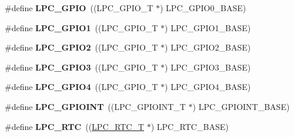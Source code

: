 \begin{DoxyCompactItemize}
\item 
\hypertarget{group___p_e_r_i_p_h__175_x__6_x___b_a_s_e_ga8fce6a072685922bf3ebc1aa9070f408}{\#define {\bfseries L\+P\+C\+\_\+\+G\+P\+I\+O}~((L\+P\+C\+\_\+\+G\+P\+I\+O\+\_\+\+T             $\ast$) L\+P\+C\+\_\+\+G\+P\+I\+O0\+\_\+\+B\+A\+S\+E)}\label{group___p_e_r_i_p_h__175_x__6_x___b_a_s_e_ga8fce6a072685922bf3ebc1aa9070f408}

\item 
\hypertarget{group___p_e_r_i_p_h__175_x__6_x___b_a_s_e_ga335587dad4e6d0da56c1f3ad1c087d10}{\#define {\bfseries L\+P\+C\+\_\+\+G\+P\+I\+O1}~((L\+P\+C\+\_\+\+G\+P\+I\+O\+\_\+\+T             $\ast$) L\+P\+C\+\_\+\+G\+P\+I\+O1\+\_\+\+B\+A\+S\+E)}\label{group___p_e_r_i_p_h__175_x__6_x___b_a_s_e_ga335587dad4e6d0da56c1f3ad1c087d10}

\item 
\hypertarget{group___p_e_r_i_p_h__175_x__6_x___b_a_s_e_ga27a09e8c08f9e209c6af70b0a3c56b39}{\#define {\bfseries L\+P\+C\+\_\+\+G\+P\+I\+O2}~((L\+P\+C\+\_\+\+G\+P\+I\+O\+\_\+\+T             $\ast$) L\+P\+C\+\_\+\+G\+P\+I\+O2\+\_\+\+B\+A\+S\+E)}\label{group___p_e_r_i_p_h__175_x__6_x___b_a_s_e_ga27a09e8c08f9e209c6af70b0a3c56b39}

\item 
\hypertarget{group___p_e_r_i_p_h__175_x__6_x___b_a_s_e_ga6e961eb01d0f1e61dd9b9d5979d2aafc}{\#define {\bfseries L\+P\+C\+\_\+\+G\+P\+I\+O3}~((L\+P\+C\+\_\+\+G\+P\+I\+O\+\_\+\+T             $\ast$) L\+P\+C\+\_\+\+G\+P\+I\+O3\+\_\+\+B\+A\+S\+E)}\label{group___p_e_r_i_p_h__175_x__6_x___b_a_s_e_ga6e961eb01d0f1e61dd9b9d5979d2aafc}

\item 
\hypertarget{group___p_e_r_i_p_h__175_x__6_x___b_a_s_e_ga652a560a972d4edec8a67cd85ad4bd60}{\#define {\bfseries L\+P\+C\+\_\+\+G\+P\+I\+O4}~((L\+P\+C\+\_\+\+G\+P\+I\+O\+\_\+\+T             $\ast$) L\+P\+C\+\_\+\+G\+P\+I\+O4\+\_\+\+B\+A\+S\+E)}\label{group___p_e_r_i_p_h__175_x__6_x___b_a_s_e_ga652a560a972d4edec8a67cd85ad4bd60}

\item 
\hypertarget{group___p_e_r_i_p_h__175_x__6_x___b_a_s_e_gaefe2f52407c1ce58395766dc760525b5}{\#define {\bfseries L\+P\+C\+\_\+\+G\+P\+I\+O\+I\+N\+T}~((L\+P\+C\+\_\+\+G\+P\+I\+O\+I\+N\+T\+\_\+\+T          $\ast$) L\+P\+C\+\_\+\+G\+P\+I\+O\+I\+N\+T\+\_\+\+B\+A\+S\+E)}\label{group___p_e_r_i_p_h__175_x__6_x___b_a_s_e_gaefe2f52407c1ce58395766dc760525b5}

\item 
\hypertarget{group___p_e_r_i_p_h__175_x__6_x___b_a_s_e_ga8303d3e5135b2a039f0dc5f93c194f78}{\#define {\bfseries L\+P\+C\+\_\+\+R\+T\+C}~((\hyperlink{struct_l_p_c___r_t_c___t}{L\+P\+C\+\_\+\+R\+T\+C\+\_\+\+T}              $\ast$) L\+P\+C\+\_\+\+R\+T\+C\+\_\+\+B\+A\+S\+E)}\label{group___p_e_r_i_p_h__175_x__6_x___b_a_s_e_ga8303d3e5135b2a039f0dc5f93c194f78}


\end{DoxyCompactItemize}
